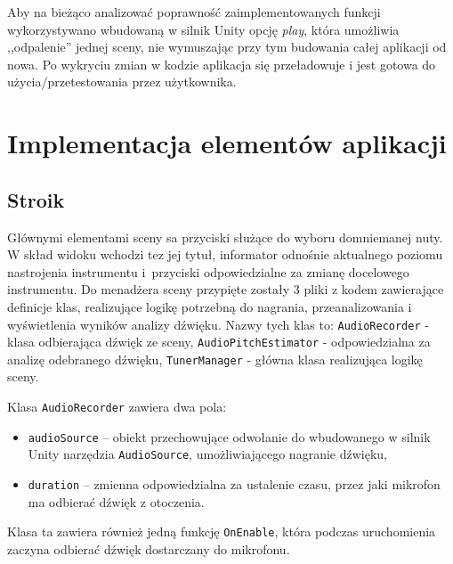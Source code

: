 Aby na bieżąco analizować poprawność zaimplementowanych funkcji wykorzystywano wbudowaną w silnik Unity opcję \emph{play}, która umożliwia ,,odpalenie'' jednej sceny, nie wymuszając przy tym budowania całej aplikacji od nowa. Po wykryciu zmian w kodzie aplikacja się przeładowuje i jest gotowa do użycia/przetestowania przez użytkownika.

\section{Implementacja elementów aplikacji}

\subsection{Stroik}

Głównymi elementami sceny sa przyciski służące do wyboru domniemanej nuty. W skład widoku wchodzi tez jej tytuł, informator odnośnie aktualnego poziomu nastrojenia instrumentu i~przyciski odpowiedzialne za zmianę docelowego instrumentu. Do menadżera sceny przypięte zostały 3 pliki z kodem zawierające definicje klas, realizujące logikę potrzebną do nagrania, przeanalizowania i wyświetlenia wyników analizy dźwięku. Nazwy tych klas to: \texttt{AudioRecorder} - klasa odbierająca dźwięk ze sceny, \texttt{AudioPitchEstimator} - odpowiedzialna za analizę odebranego dźwięku, \texttt{TunerManager} - główna klasa realizująca logikę sceny. 

Klasa \texttt{AudioRecorder} zawiera dwa pola:
\begin{itemize}
    \item \texttt{audioSource} -- obiekt przechowujące odwołanie do wbudowanego w silnik Unity narzędzia \texttt{AudioSource}, umożliwiającego nagranie dźwięku,
    \item \texttt{duration} -- zmienna odpowiedzialna za ustalenie czasu, przez jaki mikrofon ma odbierać dźwięk z otoczenia.
\end{itemize}
Klasa ta zawiera również jedną funkcję \texttt{OnEnable}, która podczas uruchomienia zaczyna odbierać dźwięk dostarczany do mikrofonu. 


